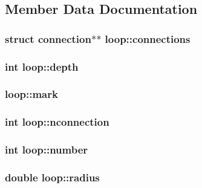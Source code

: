 \subsection{Member Data Documentation}
\hypertarget{structloop_a85ed661384f3377c0a3c097420330198}{
\subsubsection[{connections}]{\setlength{\rightskip}{0pt plus 5cm}struct {\bf connection}$\ast$$\ast$ loop\+::connections}}\label{structloop_a85ed661384f3377c0a3c097420330198}
\hypertarget{structloop_a3ebdd99aa3fb443f33a26ac8816a8112}{
\subsubsection[{depth}]{\setlength{\rightskip}{0pt plus 5cm}int loop\+::depth}}\label{structloop_a3ebdd99aa3fb443f33a26ac8816a8112}
\hypertarget{structloop_abc3be3dad4089b9b6a81781bf979fbbe}{
\subsubsection[{mark}]{ loop\+::mark}}\label{structloop_abc3be3dad4089b9b6a81781bf979fbbe}
\hypertarget{structloop_ac618052090293f928ddacbecc778a76c}{
\subsubsection[{nconnection}]{\setlength{\rightskip}{0pt plus 5cm}int loop\+::nconnection}}\label{structloop_ac618052090293f928ddacbecc778a76c}
\hypertarget{structloop_a7a839c1fed29a1dc9f486ec13b21bf99}{
\subsubsection[{number}]{\setlength{\rightskip}{0pt plus 5cm}int loop\+::number}}\label{structloop_a7a839c1fed29a1dc9f486ec13b21bf99}
\hypertarget{structloop_aac247baea3825b6d13f2021b86460602}{
\subsubsection[{radius}]{\setlength{\rightskip}{0pt plus 5cm}double loop\+::radius}}\label{structloop_aac247baea3825b6d13f2021b86460602}
